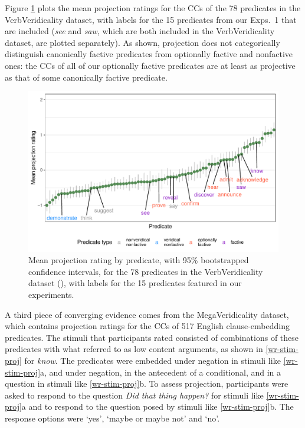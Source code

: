 \documentclass{language}
\newcommand{\6}{\mbox{$[\hspace*{-.6mm}[$}}
\newcommand{\9}{\mbox{$]\hspace*{-.6mm}]$}}
\begin{document}
Figure \ref{f-vv-projectivity} plots the mean projection ratings for the CCs of the 78 predicates in the VerbVeridicality dataset, with labels for the 15 predicates from our Exps.~1 that are included ({\em see} and {\em saw}, which are both included in the VerbVeridicality dataset, are plotted separately). As shown, projection does not categorically distinguish canonically factive predicates from optionally factive and nonfactive ones: the CCs of all of our optionally factive predicates are at least as projective as that of some canonically factive predicate. 


\begin{figure}[H]
\centering
\includegraphics[width=.77\paperwidth]{Language-figures/color/Figure6.pdf}

\caption{Mean projection rating by predicate, with 95\% bootstrapped confidence intervals, for the 78 predicates in the VerbVeridicality dataset (\citealt{ross-pavlick2019}), with labels for the 15 predicates featured in our experiments.}
\label{f-vv-projectivity}
\end{figure}



A third piece of converging evidence comes from the MegaVeridicality dataset, which contains projection ratings for the CCs of 517 English clause-embedding predicates. The stimuli that participants rated consisted of combinations of these predicates with what \citet{white-rawlins-nels2018} referred to as low content arguments, as shown in \ref{wr-stim-proj} for {\em know}. The predicates were embedded under negation in stimuli like \ref{wr-stim-proj}a, and under negation, in the antecedent of a conditional, and in a question in stimuli like \ref{wr-stim-proj}b. To assess projection, participants were asked to respond to the question {\em Did that thing happen?} for stimuli like \ref{wr-stim-proj}a and to respond to the question posed by stimuli like \ref{wr-stim-proj}b. The response options were `yes', `maybe or maybe not' and `no'. 
\end{document}
